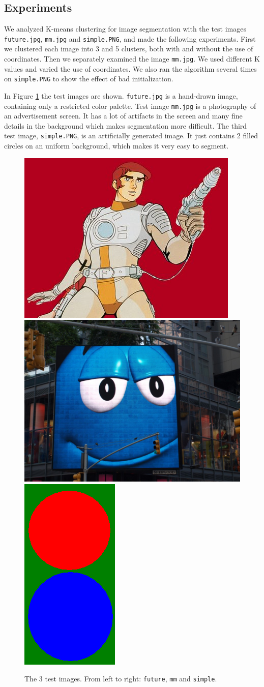\subsection{Experiments}

We analyzed K-means clustering for image segmentation with the test images \texttt{future.jpg}, \texttt{mm.jpg} and \texttt{simple.PNG}, and made the following experiments. First we clustered each image into 3 and 5 clusters, both with and without the use of coordinates. Then we separately examined the image \texttt{mm.jpg}. We used different K values and varied the use of coordinates. We also ran the algorithm several times on \texttt{simple.PNG} to show the effect of bad initialization.

In Figure \ref{fig:testimages} the test images are shown. \texttt{future.jpg} is a hand-drawn image, containing only a restricted color palette. Test image \texttt{mm.jpg} is a photography of an advertisement screen. It has a lot of artifacts in the screen and many fine details in the background which makes segmentation more difficult. The third test image, \texttt{simple.PNG}, is an artificially generated image. It just contains 2 filled circles on an uniform background, which makes it very easy to segment.
\begin{figure}[h!]
	\includegraphics[width=0.38\linewidth]{figures/task2/future.jpg}
	\includegraphics[width=0.398\linewidth]{figures/task2/mm.jpg}
	\includegraphics[width=0.15\linewidth]{figures/task2/simple.PNG}
	\caption{The 3 test images. From left to right: \texttt{future}, \texttt{mm} and \texttt{simple}.}
	\label{fig:testimages}
\end{figure}

